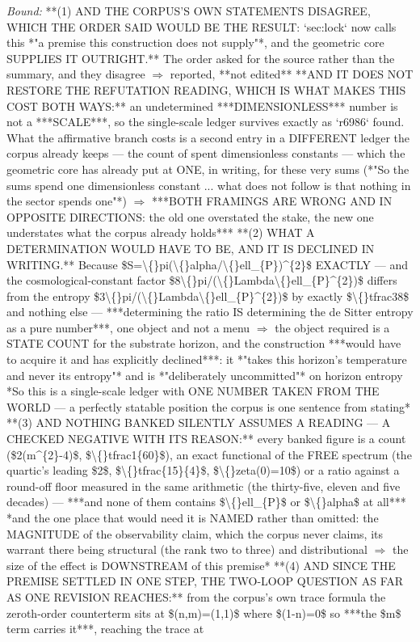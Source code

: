 \begin{description}
 \emph{Bound:}  **(1) AND THE CORPUS'S OWN STATEMENTS DISAGREE, WHICH THE ORDER SAID WOULD BE THE RESULT: `sec:lock` now calls this *"a premise this construction does not supply"*, and the geometric core SUPPLIES IT OUTRIGHT.** The order asked for the source rather than the summary, and they disagree \ensuremath{\Rightarrow} reported, **not edited**   **AND IT DOES NOT RESTORE THE REFUTATION READING, WHICH IS WHAT MAKES THIS COST BOTH WAYS:** an undetermined ***DIMENSIONLESS*** number is not a ***SCALE***, so the single-scale ledger survives exactly as `r6986` found. What the affirmative branch costs is a second entry in a DIFFERENT ledger the corpus already keeps --- the count of spent dimensionless constants --- which the geometric core has already put at ONE, in writing, for these very sums (*"So the sums spend one dimensionless constant ... what does not follow is that nothing in the sector spends one"*) \ensuremath{\Rightarrow} ***BOTH FRAMINGS ARE WRONG AND IN OPPOSITE DIRECTIONS: the old one overstated the stake, the new one understates what the corpus already holds***  **(2) WHAT A DETERMINATION WOULD HAVE TO BE, AND IT IS DECLINED IN WRITING.** Because \$S=\textbackslash\{\}pi(\textbackslash\{\}alpha/\textbackslash\{\}ell\_\{P\})\textasciicircum{}\{2\}\$ EXACTLY --- and the cosmological-constant factor \$8\textbackslash\{\}pi/(\textbackslash\{\}Lambda\textbackslash\{\}ell\_\{P\}\textasciicircum{}\{2\})\$ differs from the entropy \$3\textbackslash\{\}pi/(\textbackslash\{\}Lambda\textbackslash\{\}ell\_\{P\}\textasciicircum{}\{2\})\$ by exactly \$\textbackslash\{\}tfrac38\$ and nothing else --- ***determining the ratio IS determining the de Sitter entropy as a pure number***, one object and not a menu \ensuremath{\Rightarrow} the object required is a STATE COUNT for the substrate horizon, and the construction ***would have to acquire it and has explicitly declined***: it *"takes this horizon's temperature and never its entropy"* and is *"deliberately uncommitted"* on horizon entropy  *So this is a single-scale ledger with ONE NUMBER TAKEN FROM THE WORLD --- a perfectly statable position the corpus is one sentence from stating*  **(3) AND NOTHING BANKED SILENTLY ASSUMES A READING --- A CHECKED NEGATIVE WITH ITS REASON:** every banked figure is a count (\$2(m\textasciicircum{}\{2\}-4)\$, \$\textbackslash\{\}tfrac1\{60\}\$), an exact functional of the FREE spectrum (the quartic's leading \$2\$, \$\textbackslash\{\}tfrac\{15\}\{4\}\$, \$\textbackslash\{\}zeta(0)=10\$) or a ratio against a round-off floor measured in the same arithmetic (the thirty-five, eleven and five decades) --- ***and none of them contains \$\textbackslash\{\}ell\_\{P\}\$ or \$\textbackslash\{\}alpha\$ at all***  *and the one place that would need it is NAMED rather than omitted: the MAGNITUDE of the observability claim, which the corpus never claims, its warrant there being structural (the rank two to three) and distributional \ensuremath{\Rightarrow} the size of the effect is DOWNSTREAM of this premise*  **(4) AND SINCE THE PREMISE SETTLED IN ONE STEP, THE TWO-LOOP QUESTION AS FAR AS ONE REVISION REACHES:** from the corpus's own trace formula the zeroth-order counterterm sits at \$(n,m)=(1,1)\$ where \$(1-n)=0\$ so ***the \$m\$ term carries it***, reaching the trace at 
\end{description}
